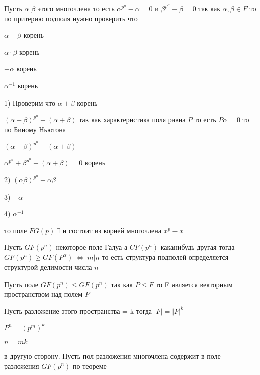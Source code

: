Пусть $\alpha$ $\beta$ этого многочлена то есть $\alpha^{p^n} - \alpha = 0$ и
$\beta^{p^{\alpha}} - \beta = 0$ так как $\alpha, \beta \in F$ то по притерию
подполя нужно проверить что

$\alpha + \beta$ корень

$\alpha \cdot \beta$ корень

$-\alpha$ корень

$\alpha^{-1}$ корень

1) Проверим что $\alpha + \beta$ корень

$(\alpha + \beta)^{p^n} - (\alpha + \beta)$ так как характеристика поля равна
$P$ то есть $P\alpha = 0$ то по Биному Ньютона

$(\alpha + \beta)^{p^n} - (\alpha+\beta)$

$\alpha^{p^n} + \beta^{p^n} - (\alpha+\beta) = 0$ корень

2) $(\alpha \beta)^{p^n} - \alpha \beta$

3) $-\alpha$

4) $\alpha^{-1}$

то поле $FG(p) ~ \exists$ и состоит из корней многочлена $x^p - x$

\begin{theorem}
  Пусть $GF(p^n)$ некоторое поле Галуа а $CF(p^n)$ каканибудь другая тогда
  $GF(p^n) \ge GF(P^{\alpha}) ~ \Leftrightarrow ~ m|n$
  то есть структура подполей определяется структурой делимости числа $n$
\end{theorem}

Пусть поле $GF(p^n) \le GF(p^n)$ так как $P \le F$ то F является векторным
пространством над полем $P$

Пусть разложение этого пространства = k тогда $|F| = |P|^k$

$P^n = (p^m)^k$

$n = mk$

в другую сторону. Пусть пол разложения многочлена содержит в поле разложения
$GF(p^n)$ по теореме